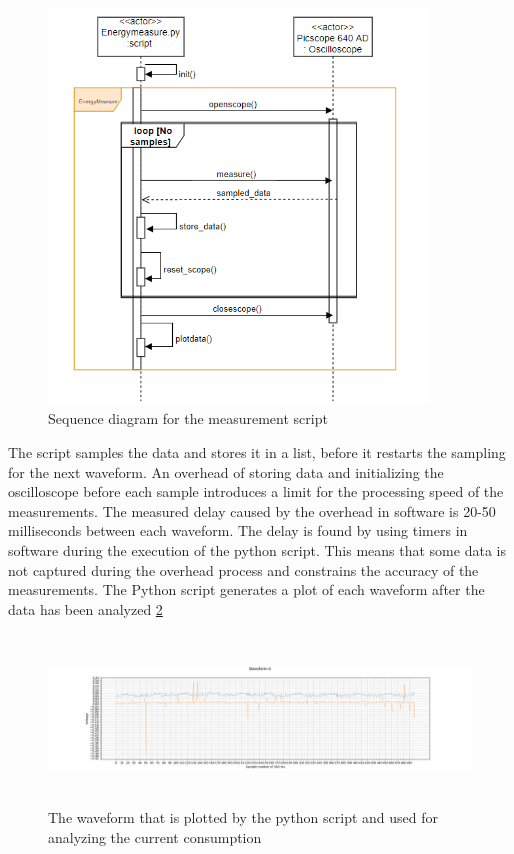 \begin{figure}[H]
\centering
\includegraphics[height=10.5cm]{Project_Report/Images/Sequence_diagram.PNG}
\caption{Sequence diagram for the measurement script}
\label{fig:sequence}
\end{figure}
 

 The script samples the data and stores it in a list, before it restarts the sampling for the next waveform. An overhead of storing data and initializing the oscilloscope before each sample introduces a limit for the processing speed of the measurements. The measured delay caused by the overhead in software is 20-50 milliseconds between each waveform. The delay is found by using timers in software during the execution of the python script. This means that some data is not captured during the overhead process and constrains the accuracy of the measurements.
The Python script generates a plot of each waveform after the data has been analyzed \ref{fig:pythonwaveform}

\begin{figure}[H]
\centering
\includegraphics[height=4.5cm]{Project_Report/Images/pythonwaveform.png}
\caption{The waveform that is plotted by the python script and used for analyzing the current consumption}
\label{fig:pythonwaveform}
\end{figure}
 
